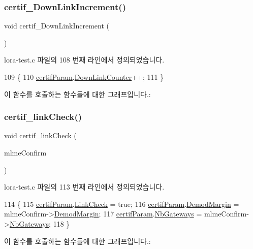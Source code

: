 \subsubsection{\texorpdfstring{certif\+\_\+\+Down\+Link\+Increment()}{certif\_DownLinkIncrement()}}
{\footnotesize\ttfamily void certif\+\_\+\+Down\+Link\+Increment (\begin{DoxyParamCaption}\item[{void}]{ }\end{DoxyParamCaption})}



lora-\/test.\+c 파일의 108 번째 라인에서 정의되었습니다.


\begin{DoxyCode}
109 \{
110     \mbox{\hyperlink{lora-test_8c_afed64ac962fb28f92cbc92acb72b0b7a}{certifParam}}.\mbox{\hyperlink{struct_compliance_test__s_a76fae6cae1874b9700238a561ef49305}{DownLinkCounter}}++;
111 \}
\end{DoxyCode}
이 함수를 호출하는 함수들에 대한 그래프입니다.\+:
\mbox{\label{lora-test_8c_a39763fc2f0d7f70bf980b9508cd7e021}} 
\subsubsection{\texorpdfstring{certif\+\_\+link\+Check()}{certif\_linkCheck()}}
{\footnotesize\ttfamily void certif\+\_\+link\+Check (\begin{DoxyParamCaption}\item[{\mbox{\hyperlink{group___l_o_r_a_m_a_c_ga73d9d9e11e282a6c258c4d22865fe824}{Mlme\+Confirm\+\_\+t}} $\ast$}]{mlme\+Confirm }\end{DoxyParamCaption})}



lora-\/test.\+c 파일의 113 번째 라인에서 정의되었습니다.


\begin{DoxyCode}
114 \{
115   \mbox{\hyperlink{lora-test_8c_afed64ac962fb28f92cbc92acb72b0b7a}{certifParam}}.\mbox{\hyperlink{struct_compliance_test__s_adeaa3c79dc995e74f45bffef6c768edb}{LinkCheck}} = \textcolor{keyword}{true};
116   \mbox{\hyperlink{lora-test_8c_afed64ac962fb28f92cbc92acb72b0b7a}{certifParam}}.\mbox{\hyperlink{struct_compliance_test__s_a60502ba4c33cf0435f086a1a9f1b5116}{DemodMargin}} = mlmeConfirm->\mbox{\hyperlink{structs_mlme_confirm_a60502ba4c33cf0435f086a1a9f1b5116}{DemodMargin}};
117   \mbox{\hyperlink{lora-test_8c_afed64ac962fb28f92cbc92acb72b0b7a}{certifParam}}.\mbox{\hyperlink{struct_compliance_test__s_ac2fbb4be8e3cc46943038a1796010d71}{NbGateways}} = mlmeConfirm->\mbox{\hyperlink{structs_mlme_confirm_ac2fbb4be8e3cc46943038a1796010d71}{NbGateways}};
118 \}
\end{DoxyCode}
이 함수를 호출하는 함수들에 대한 그래프입니다.\+:
\mbox{\label{lora-test_8c_ae856642063d609fa42633f12c85fa318}} 

